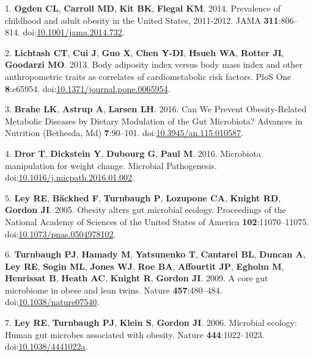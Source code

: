 \documentclass[12pt,]{article}
\begin{document}
\hypertarget{refs}{}
\hypertarget{ref-ogdenux5fprevalenceux5f2014}{}
1. \textbf{Ogden CL}, \textbf{Carroll MD}, \textbf{Kit BK},
\textbf{Flegal KM}. 2014. Prevalence of childhood and adult obesity in
the United States, 2011-2012. JAMA \textbf{311}:806--814.
doi:\href{https://doi.org/10.1001/jama.2014.732}{10.1001/jama.2014.732}.

\hypertarget{ref-lichtashux5fbodyux5f2013}{}
2. \textbf{Lichtash CT}, \textbf{Cui J}, \textbf{Guo X}, \textbf{Chen
Y-DI}, \textbf{Hsueh WA}, \textbf{Rotter JI}, \textbf{Goodarzi MO}.
2013. Body adiposity index versus body mass index and other
anthropometric traits as correlates of cardiometabolic risk factors.
PloS One \textbf{8}:e65954.
doi:\href{https://doi.org/10.1371/journal.pone.0065954}{10.1371/journal.pone.0065954}.

\hypertarget{ref-braheux5fcanux5f2016}{}
3. \textbf{Brahe LK}, \textbf{Astrup A}, \textbf{Larsen LH}. 2016. Can
We Prevent Obesity-Related Metabolic Diseases by Dietary Modulation of
the Gut Microbiota? Advances in Nutrition (Bethesda, Md)
\textbf{7}:90--101.
doi:\href{https://doi.org/10.3945/an.115.010587}{10.3945/an.115.010587}.

\hypertarget{ref-drorux5fmicrobiotaux5f2016}{}
4. \textbf{Dror T}, \textbf{Dickstein Y}, \textbf{Dubourg G},
\textbf{Paul M}. 2016. Microbiota manipulation for weight change.
Microbial Pathogenesis.
doi:\href{https://doi.org/10.1016/j.micpath.2016.01.002}{10.1016/j.micpath.2016.01.002}.

\hypertarget{ref-leyux5fobesityux5f2005}{}
5. \textbf{Ley RE}, \textbf{Bäckhed F}, \textbf{Turnbaugh P},
\textbf{Lozupone CA}, \textbf{Knight RD}, \textbf{Gordon JI}. 2005.
Obesity alters gut microbial ecology. Proceedings of the National
Academy of Sciences of the United States of America
\textbf{102}:11070--11075.
doi:\href{https://doi.org/10.1073/pnas.0504978102}{10.1073/pnas.0504978102}.

\hypertarget{ref-turnbaughux5fcoreux5f2009}{}
6. \textbf{Turnbaugh PJ}, \textbf{Hamady M}, \textbf{Yatsunenko T},
\textbf{Cantarel BL}, \textbf{Duncan A}, \textbf{Ley RE}, \textbf{Sogin
ML}, \textbf{Jones WJ}, \textbf{Roe BA}, \textbf{Affourtit JP},
\textbf{Egholm M}, \textbf{Henrissat B}, \textbf{Heath AC},
\textbf{Knight R}, \textbf{Gordon JI}. 2009. A core gut microbiome in
obese and lean twins. Nature \textbf{457}:480--484.
doi:\href{https://doi.org/10.1038/nature07540}{10.1038/nature07540}.

\hypertarget{ref-leyux5fmicrobialux5f2006}{}
7. \textbf{Ley RE}, \textbf{Turnbaugh PJ}, \textbf{Klein S},
\textbf{Gordon JI}. 2006. Microbial ecology: Human gut microbes
associated with obesity. Nature \textbf{444}:1022--1023.
doi:\href{https://doi.org/10.1038/4441022a}{10.1038/4441022a}.
\end{document}
